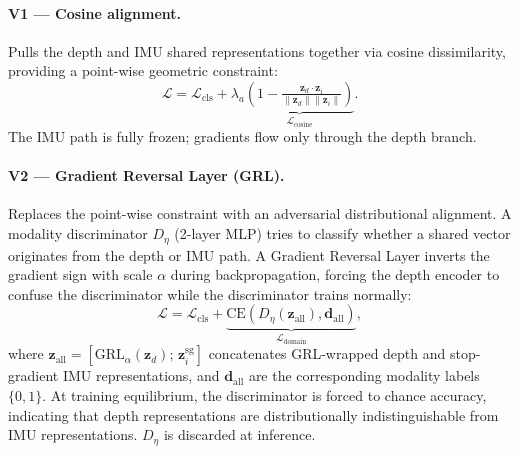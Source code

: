 \documentclass[sigconf,anonymous=false]{acmart}
\begin{document}
\paragraph{V1 --- Cosine alignment.}
Pulls the depth and IMU shared representations together via cosine
dissimilarity, providing a point-wise geometric constraint:
\begin{equation}
  \mathcal{L} = \mathcal{L}_\text{cls}
              + \lambda_a\underbrace{\!\left(1
              - \tfrac{\mathbf{z}_d\cdot\mathbf{z}_i}
                      {\|\mathbf{z}_d\|\|\mathbf{z}_i\|}\right)
              }_{\mathcal{L}_\text{cosine}}.
  \label{eq:v1}
\end{equation}
The IMU path is fully frozen; gradients flow only through the depth branch.

\paragraph{V2 --- Gradient Reversal Layer (GRL).}
Replaces the point-wise constraint with an adversarial distributional
alignment.  A modality discriminator $D_\eta$ (2-layer MLP) tries to
classify whether a shared vector originates from the depth or IMU path.
A Gradient Reversal Layer inverts the gradient sign with scale $\alpha$
during backpropagation, forcing the depth encoder to confuse the
discriminator while the discriminator trains normally:
\begin{equation}
  \mathcal{L} = \mathcal{L}_\text{cls}
              + \underbrace{\text{CE}(D_\eta(\mathbf{z}_\text{all}),
                            \mathbf{d}_\text{all})
              }_{\mathcal{L}_\text{domain}},
  \label{eq:v2}
\end{equation}
where $\mathbf{z}_\text{all} = [\text{GRL}_\alpha(\mathbf{z}_d);\,
\mathbf{z}_i^{\text{sg}}]$ concatenates GRL-wrapped depth and
stop-gradient IMU representations, and $\mathbf{d}_\text{all}$ are the
corresponding modality labels $\{0,1\}$.
At training equilibrium, the discriminator is forced to chance accuracy,
indicating that depth representations are distributionally indistinguishable
from IMU representations.  $D_\eta$ is discarded at inference.
\end{document}
